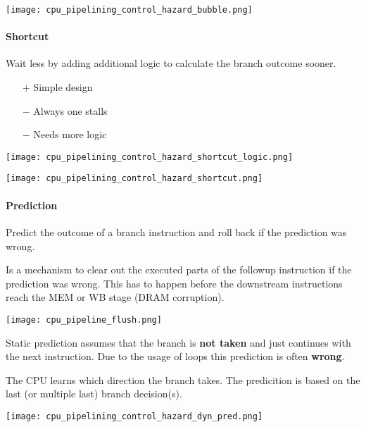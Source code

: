 \begin{multicols*}{2}
    \texttt{[image: cpu\_pipelining\_control\_hazard\_bubble.png]}

    \paragraph{Shortcut}\label{shortcut}

    Wait less by adding additional logic to calculate the branch outcome sooner.

    \begin{itemize}
        \item[+] Simple design
        \item[$-$] Always one stalls
        \item[$-$] Needs more logic
    \end{itemize}

    \texttt{[image: cpu\_pipelining\_control\_hazard\_shortcut\_logic.png]}

    \texttt{[image: cpu\_pipelining\_control\_hazard\_shortcut.png]}

    \paragraph{Prediction}\label{prediction}

    Predict the outcome of a branch instruction and roll back if the prediction was wrong.

    \newpar{}

    Is a mechanism to clear out the executed parts of the followup instruction if the prediction was wrong. This has to happen before the downstream instructions reach the MEM or WB stage (DRAM corruption).
    \begin{center}
        \texttt{[image: cpu\_pipeline\_flush.png]}
    \end{center}
    \newpar{}

    Static prediction assumes that the branch is \textbf{not taken} and just continues with the next instruction. Due to the usage of loops this prediction is often \textbf{wrong}.

    \newpar{}

    The CPU learns which direction the branch takes. The predicition is based on the last (or multiple last) branch decision(s). %
    \begin{center}
        \texttt{[image: cpu\_pipelining\_control\_hazard\_dyn\_pred.png]}
    \end{center}


\end{multicols*}
